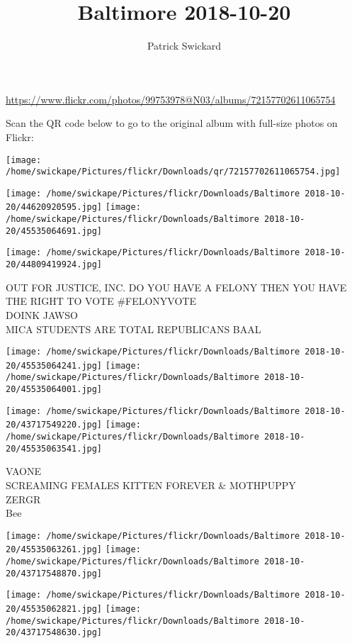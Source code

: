 \documentclass[10pt,letterpaper]{article}
\title{Baltimore 2018-10-20}
\author{Patrick Swickard}
\date{}
\begin{document}
\maketitle

\url{https://www.flickr.com/photos/99753978@N03/albums/72157702611065754}

Scan the QR code below to go to the original album with full-size photos on Flickr:

\texttt{[image: /home/swickape/Pictures/flickr/Downloads/qr/72157702611065754.jpg]}
\pagebreak

\texttt{[image: /home/swickape/Pictures/flickr/Downloads/Baltimore 2018-10-20/44620920595.jpg]}
\texttt{[image: /home/swickape/Pictures/flickr/Downloads/Baltimore 2018-10-20/45535064691.jpg]}

\vspace{0.25in}
\texttt{[image: /home/swickape/Pictures/flickr/Downloads/Baltimore 2018-10-20/44809419924.jpg]}

OUT FOR JUSTICE, INC. DO YOU HAVE A FELONY THEN YOU HAVE THE RIGHT TO VOTE \#FELONYVOTE\\
DOINK JAWSO\\
MICA STUDENTS ARE TOTAL REPUBLICANS BAAL
\pagebreak

\texttt{[image: /home/swickape/Pictures/flickr/Downloads/Baltimore 2018-10-20/45535064241.jpg]}
\texttt{[image: /home/swickape/Pictures/flickr/Downloads/Baltimore 2018-10-20/45535064001.jpg]}

\texttt{[image: /home/swickape/Pictures/flickr/Downloads/Baltimore 2018-10-20/43717549220.jpg]}
\texttt{[image: /home/swickape/Pictures/flickr/Downloads/Baltimore 2018-10-20/45535063541.jpg]}

VAONE\\
SCREAMING FEMALES KITTEN FOREVER \& MOTHPUPPY\\
ZERGR\\
Bee
\pagebreak

\texttt{[image: /home/swickape/Pictures/flickr/Downloads/Baltimore 2018-10-20/45535063261.jpg]}
\texttt{[image: /home/swickape/Pictures/flickr/Downloads/Baltimore 2018-10-20/43717548870.jpg]}

\texttt{[image: /home/swickape/Pictures/flickr/Downloads/Baltimore 2018-10-20/45535062821.jpg]}
\texttt{[image: /home/swickape/Pictures/flickr/Downloads/Baltimore 2018-10-20/43717548630.jpg]}
\end{document}
